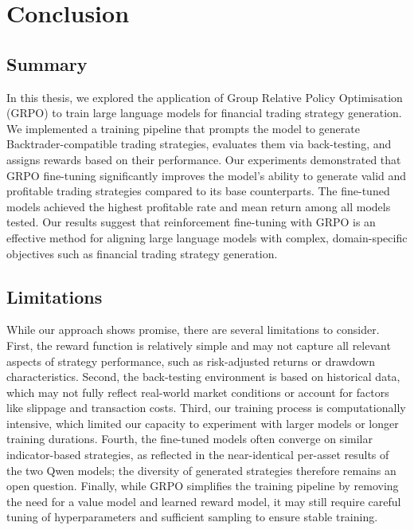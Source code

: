 \documentclass[12pt, a4paper]{report}
\begin{document}
\chapter{Conclusion}
\label{ch:conclusion}

\section{Summary}

In this thesis, we explored the application of Group Relative Policy Optimisation (GRPO) to train large language models for financial trading strategy generation. 
We implemented a training pipeline that prompts the model to generate Backtrader-compatible trading strategies, evaluates them via back-testing, and assigns rewards based on their performance. 
Our experiments demonstrated that GRPO fine-tuning significantly improves the model's ability to generate valid and profitable trading strategies compared to its base counterparts. 
The fine-tuned models achieved the highest profitable rate and mean return among all models tested. 
Our results suggest that reinforcement fine-tuning with GRPO is an effective method for aligning large language models with complex, domain-specific objectives such as financial trading strategy generation.

\section{Limitations}

While our approach shows promise, there are several limitations to consider. 
First, the reward function is relatively simple and may not capture all relevant aspects of strategy performance, such as risk-adjusted returns or drawdown characteristics. 
Second, the back-testing environment is based on historical data, which may not fully reflect real-world market conditions or account for factors like slippage and transaction costs. 
Third, our training process is computationally intensive, which limited our capacity to experiment with larger models or longer training durations.
Fourth, the fine-tuned models often converge on similar indicator-based strategies, as reflected in the near-identical per-asset results of the two Qwen models; the diversity of generated strategies therefore remains an open question.
Finally, while GRPO simplifies the training pipeline by removing the need for a value model and learned reward model, it may still require careful tuning of hyperparameters and sufficient sampling to ensure stable training.
\end{document}
